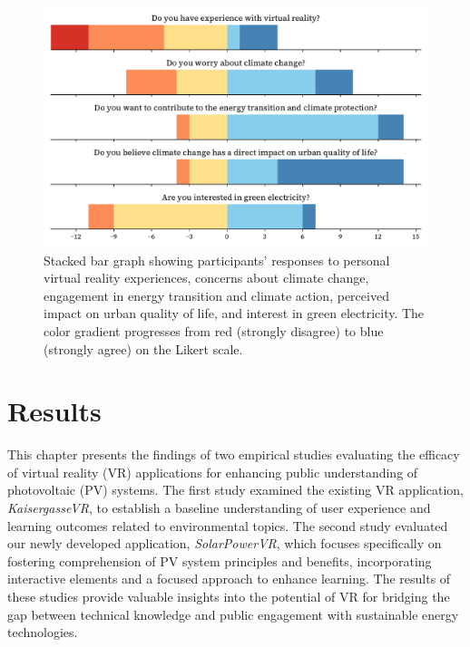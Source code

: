 \documentclass[draft, final]{vutinfth} %
\begin{document}
\begin{figure}[h]
    \centering
    \includegraphics[width=\textwidth]{graphics/participants-solarpowervr.pdf}
    \caption[Participant Responses Summary]{Stacked bar graph showing participants' responses to personal virtual reality experiences, concerns about climate change, engagement in energy transition and climate action, perceived impact on urban quality of life, and interest in green electricity. The color gradient progresses from red (strongly disagree) to blue (strongly agree) on the Likert scale.}
    \label{fig:participants_solarpowervr}
\end{figure}


\chapter{Results}

This chapter presents the findings of two empirical studies evaluating the efficacy of virtual reality (VR) applications for enhancing public understanding of photovoltaic (PV) systems. The first study examined the existing VR application, \textit{KaisergasseVR}, to establish a baseline understanding of user experience and learning outcomes related to environmental topics. The second study evaluated our newly developed application, \textit{SolarPowerVR}, which focuses specifically on fostering comprehension of PV system principles and benefits, incorporating interactive elements and a focused approach to enhance learning. The results of these studies provide valuable insights into the potential of VR for bridging the gap between technical knowledge and public engagement with sustainable energy technologies.
\end{document}
